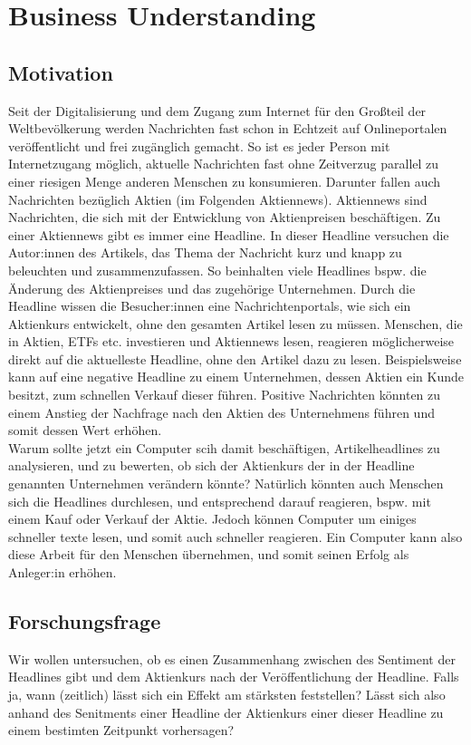 \chapter{Business Understanding}

\section*{Motivation}
Seit der Digitalisierung und dem Zugang zum Internet für den Großteil der Weltbevölkerung werden Nachrichten fast schon in Echtzeit auf Onlineportalen veröffentlicht und frei zugänglich gemacht. So ist es jeder Person mit Internetzugang möglich, aktuelle Nachrichten fast ohne Zeitverzug parallel zu einer riesigen Menge anderen Menschen zu konsumieren. Darunter fallen auch Nachrichten bezüglich Aktien (im Folgenden Aktiennews). Aktiennews sind Nachrichten, die sich mit der Entwicklung von Aktienpreisen beschäftigen. Zu einer Aktiennews gibt es immer eine Headline. In dieser Headline versuchen die Autor:innen des Artikels, das Thema der Nachricht kurz und knapp zu beleuchten und zusammenzufassen. So beinhalten viele Headlines bspw. die Änderung des Aktienpreises und das zugehörige Unternehmen. Durch die Headline wissen die Besucher:innen eine Nachrichtenportals, wie sich ein Aktienkurs entwickelt, ohne den gesamten Artikel lesen zu müssen. Menschen, die in Aktien, ETFs etc. investieren und Aktiennews lesen, reagieren möglicherweise direkt auf die aktuelleste Headline, ohne den Artikel dazu zu lesen. Beispielsweise kann auf eine negative Headline zu einem Unternehmen, dessen Aktien ein Kunde besitzt, zum schnellen Verkauf dieser führen. Positive Nachrichten könnten zu einem Anstieg der Nachfrage nach den Aktien des Unternehmens führen und somit dessen Wert erhöhen.\\
Warum sollte jetzt ein Computer scih damit beschäftigen, Artikelheadlines zu analysieren, und zu bewerten, ob sich der Aktienkurs der in der Headline genannten Unternehmen verändern könnte? Natürlich könnten auch Menschen sich die Headlines durchlesen, und entsprechend darauf reagieren, bspw. mit einem Kauf oder Verkauf der Aktie. Jedoch können Computer um einiges schneller texte lesen, und somit auch schneller reagieren. Ein Computer kann also diese Arbeit für den Menschen übernehmen, und somit seinen Erfolg als Anleger:in erhöhen.
\section*{Forschungsfrage}
Wir wollen untersuchen, ob es einen Zusammenhang zwischen des Sentiment der Headlines gibt und dem Aktienkurs nach der Veröffentlichung der Headline. Falls ja, wann (zeitlich) lässt sich ein Effekt am stärksten feststellen? Lässt sich also anhand des Senitments einer Headline der Aktienkurs einer dieser Headline zu einem bestimten Zeitpunkt vorhersagen?
